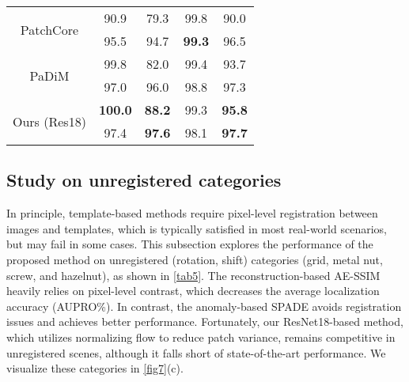 \begin{table}[htbp]
{\begin{tabular}{ccccc}
\multicolumn{1}{c}{\multirow{2}[2]{*}{PatchCore\cite{PatchCore}}} 
& \cellcolor{red!5} 90.9  & \cellcolor{red!5} 79.3  & \cellcolor{red!5} 99.8  & \cellcolor{red!5} 90.0  \\
& \cellcolor{green!5} 95.5  & \cellcolor{green!5} 94.7  & \cellcolor{green!5} \textbf{99.3 } & \cellcolor{green!5} 96.5  \\
\midrule

\multicolumn{1}{c}{\multirow{2}[2]{*}{PaDiM\cite{PaDiM}}} 
& \cellcolor{red!5} 99.8  & \cellcolor{red!5} 82.0  & \cellcolor{red!5} 99.4  & \cellcolor{red!5} 93.7  \\
& \cellcolor{green!5} 97.0  & \cellcolor{green!5} 96.0  & \cellcolor{green!5} 98.8  & \cellcolor{green!5} 97.3  \\
\midrule

\multicolumn{1}{c}{\multirow{2}[2]{*}{Ours (Res18)}} 
& \cellcolor{red!5} \textbf{100.0 } & \cellcolor{red!5} \textbf{88.2 } & \cellcolor{red!5} 99.3  & \cellcolor{red!5} \textbf{95.8 } \\
& \cellcolor{green!5} 97.4  & \cellcolor{green!5} \textbf{97.6 } & \cellcolor{green!5} 98.1  & \cellcolor{green!5} \textbf{97.7 } \\
\bottomrule

\end{tabular}


           
    }

    \label{tab4}\end{table}


\subsection{Study on unregistered categories}\label{Sec45}
In principle, template-based methods require pixel-level registration between images and templates, which is typically satisfied in most real-world scenarios, but may fail in some cases. This subsection explores the performance of the proposed method on unregistered (\eg rotation, shift) categories (\eg grid, metal nut, screw, and hazelnut), as shown in \cref{tab5}.
The reconstruction-based AE-SSIM heavily relies on pixel-level contrast, which decreases the average localization accuracy (AUPRO\%). In contrast, the anomaly-based SPADE avoids registration issues and achieves better performance. Fortunately, our ResNet18-based method, which utilizes normalizing flow to reduce patch variance, remains competitive in unregistered scenes, although it falls short of state-of-the-art performance. 
We visualize these categories in \cref{fig7}(c).

